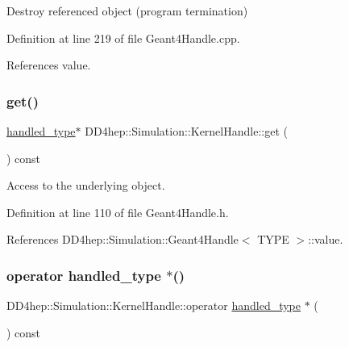 Destroy referenced object (program termination) 



Definition at line 219 of file Geant4\+Handle.\+cpp.



References value.

\hypertarget{class_d_d4hep_1_1_simulation_1_1_kernel_handle_a6cbcb5c6bb2369ce2b9c43ce1d0287c5}{}\label{class_d_d4hep_1_1_simulation_1_1_kernel_handle_a6cbcb5c6bb2369ce2b9c43ce1d0287c5} 
\subsubsection{\texorpdfstring{get()}{get()}}
{\footnotesize\ttfamily \hyperlink{class_d_d4hep_1_1_simulation_1_1_kernel_handle_ab3846addea4978dab36bdb0cfb53dc34}{handled\+\_\+type}$\ast$ D\+D4hep\+::\+Simulation\+::\+Kernel\+Handle\+::get (\begin{DoxyParamCaption}{ }\end{DoxyParamCaption}) const\hspace{0.3cm}{\ttfamily [inline]}}



Access to the underlying object. 



Definition at line 110 of file Geant4\+Handle.\+h.



References D\+D4hep\+::\+Simulation\+::\+Geant4\+Handle$<$ T\+Y\+P\+E $>$\+::value.

\hypertarget{class_d_d4hep_1_1_simulation_1_1_kernel_handle_a91a97b663c123e414c821c25cd076183}{}\label{class_d_d4hep_1_1_simulation_1_1_kernel_handle_a91a97b663c123e414c821c25cd076183} 
\subsubsection{\texorpdfstring{operator handled\+\_\+type $\ast$()}{operator handled\_type *()}}
{\footnotesize\ttfamily D\+D4hep\+::\+Simulation\+::\+Kernel\+Handle\+::operator \hyperlink{class_d_d4hep_1_1_simulation_1_1_kernel_handle_ab3846addea4978dab36bdb0cfb53dc34}{handled\+\_\+type} $\ast$ (\begin{DoxyParamCaption}{ }\end{DoxyParamCaption}) const\hspace{0.3cm}{\ttfamily [inline]}}



